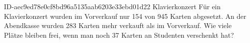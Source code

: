\begin{exercise}
      {ID-aec9ed78e0cf8bd96a5135aab6203e33ebd01d22}
      {Klavierkonzert}
  \ifproblem\problem
    Für ein Klavierkonzert wurden im Vorverkauf nur 154 von 945 Karten abgesetzt.
    An der Abendkasse wurden 283 Karten mehr verkauft als im Vorverkauf. Wie viele
    Plätze bleiben frei, wenn man noch 37 Karten an Studenten verschenkt hat?
  \fi
\end{exercise}
